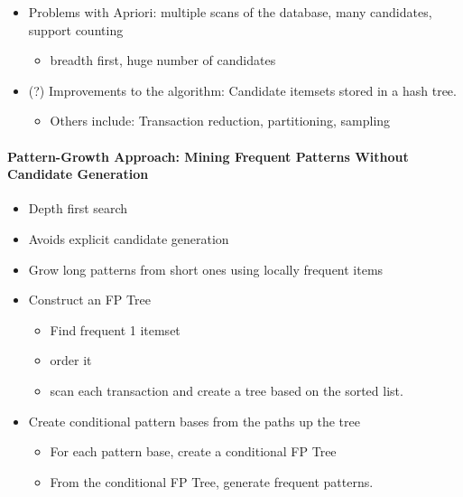 \documentclass[11pt]{article}
\providecommand{\tightlist}{%
      \setlength{\itemsep}{0pt}\setlength{\parskip}{0pt}}
\begin{document}
    \begin{itemize}
\tightlist
\item
  Problems with Apriori: multiple scans of the database, many
  candidates, support counting

  \begin{itemize}
  \tightlist
  \item
    breadth first, huge number of candidates
  \end{itemize}
\item
  (?) Improvements to the algorithm: Candidate itemsets stored in a hash
  tree.

  \begin{itemize}
  \tightlist
  \item
    Others include: Transaction reduction, partitioning, sampling
  \end{itemize}
\end{itemize}

    \paragraph{Pattern-Growth Approach: Mining Frequent Patterns Without
Candidate
Generation}\label{pattern-growth-approach-mining-frequent-patterns-without-candidate-generation}

    \begin{itemize}
\tightlist
\item
  Depth first search
\item
  Avoids explicit candidate generation
\item
  Grow long patterns from short ones using locally frequent items
\end{itemize}

    \begin{itemize}
\tightlist
\item
  Construct an FP Tree

  \begin{itemize}
  \tightlist
  \item
    Find frequent 1 itemset
  \item
    order it
  \item
    scan each transaction and create a tree based on the sorted list.
  \end{itemize}
\item
  Create conditional pattern bases from the paths up the tree

  \begin{itemize}
  \tightlist
  \item
    For each pattern base, create a conditional FP Tree
  \item
    From the conditional FP Tree, generate frequent patterns.
  \end{itemize}
\end{itemize}
\end{document}

